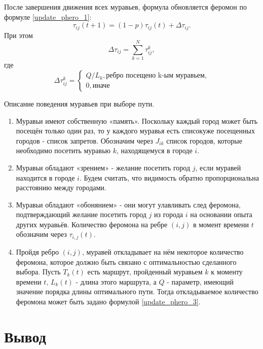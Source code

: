 \documentclass[a4paper,14pt, unknownkeysallowed]{extreport}
\begin{document}
После завершения движения всех муравьев, формула обновляется феромон по формуле \eqref{update_phero_1}:
\begin{equation}
	\label{update_phero_1}
		\tau_{ij}(t+1) = (1-p)\tau_{ij}(t) + \Delta \tau_{ij}.
\end{equation}
При этом
\begin{equation}
\label{update_phero_2}
 \Delta \tau_{ij} = \sum_{k=1}^N \tau^k_{ij},
\end{equation}
где
\begin{equation}
	\label{update_phero_3}
		 \Delta\tau^k_{ij} = \begin{cases}
		Q/L_{k}, \textrm{ребро посещено k-ым муравьем,} \\
		0, \textrm{иначе}
	\end{cases}
\end{equation}


Описание поведения муравьев при выборе пути.

\begin{enumerate}
	\item  Муравьи имеют собственную «память». Поскольку каждый город может быть посещён только один раз, то у каждого муравья есть списокуже посещенных городов - список запретов. Обозначим через $J_{ik}$ список городов, которые необходимо посетить муравью $k$, находящемуся в городе $i$.
	\item Муравьи обладают «зрением» - желание посетить город $j$, если муравей находится в городе $i$. Будем считать, что видимость обратно пропорциональна расстоянию между городами.
	\item Муравьи обладают «обонянием» - они могут улавливать след феромона, подтверждающий желание посетить город $j$ из города $i$ на основании опыта других муравьёв. Количество феромона на ребре $(i, j)$ в момент времени $t$ обозначим через $\tau_{i,j}(t)$.
	\item Пройдя ребро $(i, j)$, муравей откладывает на нём некоторое количество феромона, которое должно быть связано с оптимальностью сделанного выбора. Пусть $T_{k}(t)$ есть маршрут, пройденный муравьем $k$ к моменту времени $t$, $L_{k}(t)$ - длина этого маршрута, а $Q$ - параметр, имеющий значение порядка длины оптимального пути. Тогда откладываемое количество феромона может быть задано формулой \eqref{update_phero_3}.
\end{enumerate}

\clearpage

\section{Вывод}
\end{document}
